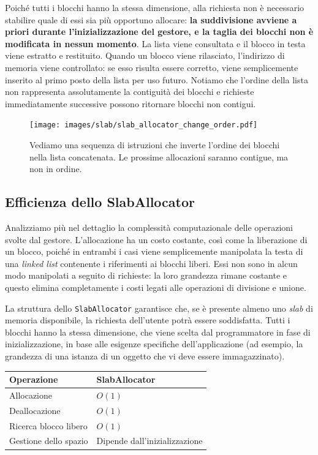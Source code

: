 Poiché tutti i blocchi hanno la stessa dimensione, alla richiesta non è necessario stabilire quale di essi sia più opportuno allocare: \textbf{la suddivisione avviene a priori durante l’inizializzazione del gestore, e la taglia dei blocchi non è modificata in nessun momento}. La lista viene consultata e il blocco in testa viene estratto e restituito. Quando un blocco viene rilasciato, l’indirizzo di memoria viene controllato: se esso risulta essere corretto, viene semplicemente inserito al primo posto della lista per uso futuro. Notiamo che l’ordine della lista non rappresenta assolutamente la contiguità dei blocchi e richieste immediatamente successive possono ritornare blocchi non contigui.

\begin{figure}[H]
    \centering
    \texttt{[image: images/slab/slab\_allocator\_change\_order.pdf]}
    \caption{Vediamo una sequenza di istruzioni che inverte l'ordine dei blocchi nella lista concatenata. Le prossime allocazioni saranno contigue, ma non in ordine.}
    \label{fig:slab_allocator_change_order}
\end{figure}

\subsection*{Efficienza dello SlabAllocator}
Analizziamo più nel dettaglio la complessità computazionale delle operazioni svolte dal gestore. L’allocazione ha un costo costante, così come la liberazione di un blocco, poiché in entrambi i casi viene semplicemente manipolata la testa di una \textit{linked list} contenente i riferimenti ai blocchi liberi. Essi non sono in alcun modo manipolati a seguito di richieste: la loro grandezza rimane costante e questo elimina completamente i costi legati alle operazioni di divisione e unione.

La struttura dello \texttt{SlabAllocator} garantisce che, se è presente almeno uno \textit{slab} di memoria disponibile, la richiesta dell’utente potrà essere soddisfatta. Tutti i blocchi hanno la stessa dimensione, che viene scelta dal programmatore in fase di inizializzazione, in base alle esigenze specifiche dell’applicazione (ad esempio, la grandezza di una istanza di un oggetto che vi deve essere immagazzinato).

\begin{center}
\begin{tabular}{|l|p{8cm}|}
\hline
Operazione & SlabAllocator \\
\hline
Allocazione & $O(1)$ \\
Deallocazione & $O(1)$ \\
Ricerca blocco libero & $O(1)$ \\
Gestione dello spazio & Dipende dall'inizializzazione \\
\hline
\end{tabular}
\end{center}

